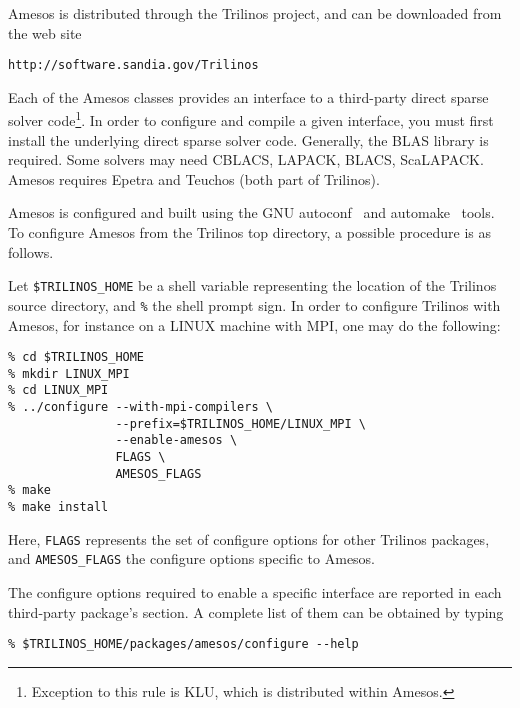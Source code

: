 \documentclass[11pt]{SANDreport}
\begin{document}
Amesos is distributed through the Trilinos project, and can be
downloaded from the web site
\begin{verbatim}
http://software.sandia.gov/Trilinos
\end{verbatim}

\smallskip

Each of the Amesos classes provides an interface to a third-party direct
sparse solver code\footnote{Exception to this rule is KLU, which is
  distributed within Amesos.}. In order to configure and compile a given
interface, you must first install the underlying direct sparse solver
code. Generally, the BLAS library is required. Some solvers may need
CBLACS, LAPACK, BLACS, ScaLAPACK. Amesos requires Epetra and Teuchos
(both part of Trilinos).

Amesos is configured and built using the GNU autoconf~\cite{Autoconf}
and automake~\cite{Automake} tools. To configure Amesos from the
Trilinos top directory, a possible procedure is as follows.

Let \verb!$TRILINOS_HOME! be a shell variable representing the location
of the Trilinos source directory, and \verb!%! the shell prompt sign.  In order to configure Trilinos with
Amesos, for instance on a LINUX machine with MPI, one may do the
following:
\begin{verbatim}
% cd $TRILINOS_HOME
% mkdir LINUX_MPI
% cd LINUX_MPI
% ../configure --with-mpi-compilers \
               --prefix=$TRILINOS_HOME/LINUX_MPI \
               --enable-amesos \
               FLAGS \
               AMESOS_FLAGS
% make
% make install
\end{verbatim}
Here, \verb!FLAGS! represents the set of configure options for other
Trilinos packages, and \verb!AMESOS_FLAGS! the configure options
specific to Amesos. 

The configure options required to enable a specific interface are
reported in each third-party package's section. A complete list of them can
be obtained by typing
\begin{verbatim}
% $TRILINOS_HOME/packages/amesos/configure --help
\end{verbatim}
\end{document}
